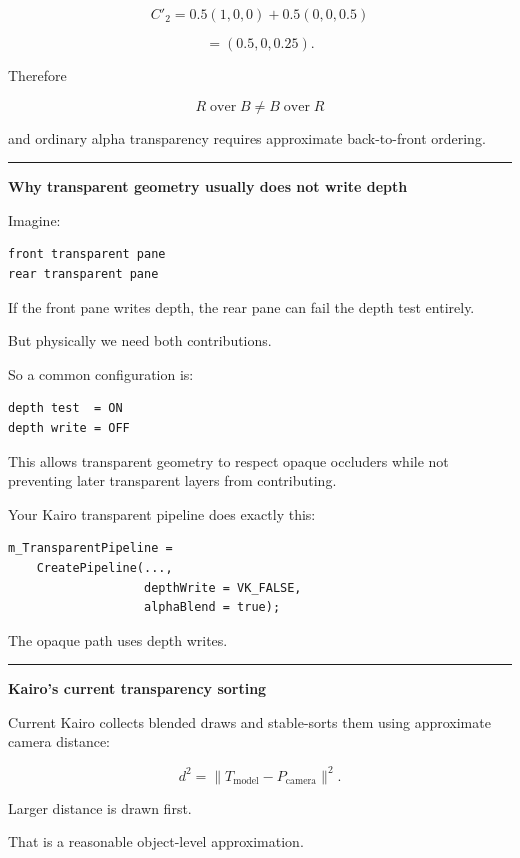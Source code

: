 \[
C'_2
=
0.5(1,0,0)+0.5(0,0,0.5)
\]

\[
=
(0.5,0,0.25).
\]

Therefore

\[
\boxed{
R\operatorname{over}B
\neq
B\operatorname{over}R
}
\]

and ordinary alpha transparency requires approximate back-to-front ordering.

\begin{center}\rule{0.5\linewidth}{0.5pt}\end{center}

\textbf{Why transparent geometry usually does not write depth}

Imagine:

\begin{verbatim}
front transparent pane
rear transparent pane
\end{verbatim}

If the front pane writes depth, the rear pane can fail the depth test entirely.

But physically we need both contributions.

So a common configuration is:

\begin{verbatim}
depth test  = ON
depth write = OFF
\end{verbatim}

This allows transparent geometry to respect opaque occluders while not preventing later transparent layers from contributing.

Your Kairo transparent pipeline does exactly this:

\begin{verbatim}
m_TransparentPipeline =
    CreatePipeline(...,
                   depthWrite = VK_FALSE,
                   alphaBlend = true);
\end{verbatim}

The opaque path uses depth writes.

\begin{center}\rule{0.5\linewidth}{0.5pt}\end{center}

\textbf{Kairo's current transparency sorting}

Current Kairo collects blended draws and stable-sorts them using approximate camera distance:

\[
d^2=\|T_{\text{model}}-P_{\text{camera}}\|^2.
\]

Larger distance is drawn first.

That is a reasonable object-level approximation.

